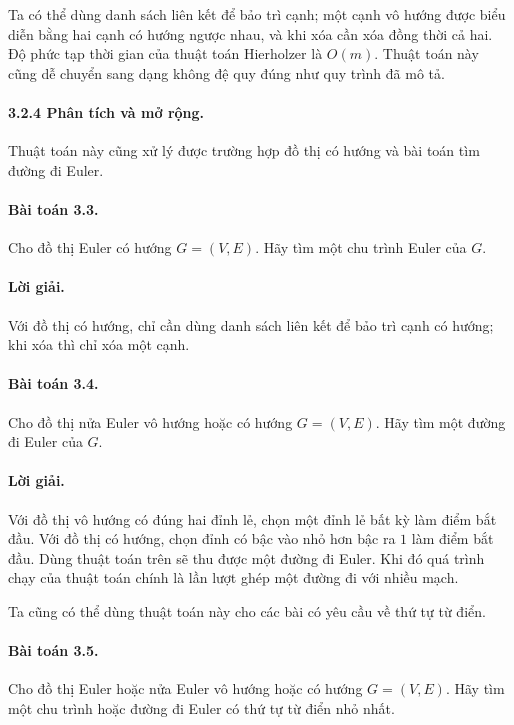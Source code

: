 \documentclass[11pt]{article}
\begin{document}
Ta có thể dùng danh sách liên kết để bảo trì cạnh; một cạnh vô hướng được biểu
diễn bằng hai cạnh có hướng ngược nhau, và khi xóa cần xóa đồng thời cả hai.
Độ phức tạp thời gian của thuật toán Hierholzer là \(O(m)\). Thuật toán này
cũng dễ chuyển sang dạng không đệ quy đúng như quy trình đã mô tả.

\paragraph{3.2.4 Phân tích và mở rộng.}
Thuật toán này cũng xử lý được trường hợp đồ thị có hướng và bài toán tìm đường
đi Euler.

\paragraph{Bài toán 3.3.}
Cho đồ thị Euler có hướng \(G=(V,E)\). Hãy tìm một chu trình Euler của \(G\).

\paragraph{Lời giải.}
Với đồ thị có hướng, chỉ cần dùng danh sách liên kết để bảo trì cạnh có hướng;
khi xóa thì chỉ xóa một cạnh.

\paragraph{Bài toán 3.4.}
Cho đồ thị nửa Euler vô hướng hoặc có hướng \(G=(V,E)\). Hãy tìm một đường đi
Euler của \(G\).

\paragraph{Lời giải.}
Với đồ thị vô hướng có đúng hai đỉnh lẻ, chọn một đỉnh lẻ bất kỳ làm điểm bắt
đầu. Với đồ thị có hướng, chọn đỉnh có bậc vào nhỏ hơn bậc ra \(1\) làm điểm
bắt đầu. Dùng thuật toán trên sẽ thu được một đường đi Euler. Khi đó quá trình
chạy của thuật toán chính là lần lượt ghép một đường đi với nhiều mạch.

Ta cũng có thể dùng thuật toán này cho các bài có yêu cầu về thứ tự từ điển.

\paragraph{Bài toán 3.5.}
Cho đồ thị Euler hoặc nửa Euler vô hướng hoặc có hướng \(G=(V,E)\). Hãy tìm một
chu trình hoặc đường đi Euler có thứ tự từ điển nhỏ nhất.
\end{document}
